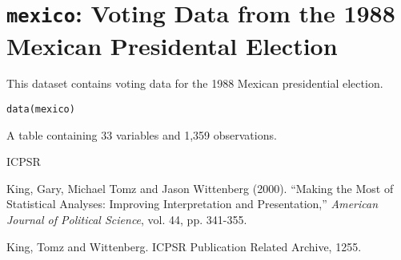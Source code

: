  \section{{\tt mexico}: Voting Data from the 1988 Mexican Presidental Election}\label{ss:mexico}
\begin{Description}\relax
This dataset contains voting data for the 1988 Mexican presidential
election.
\end{Description}
\begin{Usage}
\begin{verbatim}data(mexico)\end{verbatim}
\end{Usage}
\begin{Format}\relax
A table containing 33 variables and 1,359 observations.
\end{Format}
\begin{Source}\relax
ICPSR
\end{Source}
\begin{References}\relax
King, Gary, Michael Tomz and Jason Wittenberg (2000).
``Making the Most of Statistical Analyses: Improving Interpretation and 
Presentation,'' \emph{American Journal of Political Science}, vol. 44,
pp. 341-355.

King, Tomz and Wittenberg.  ICPSR Publication Related Archive, 1255.
\end{References}



